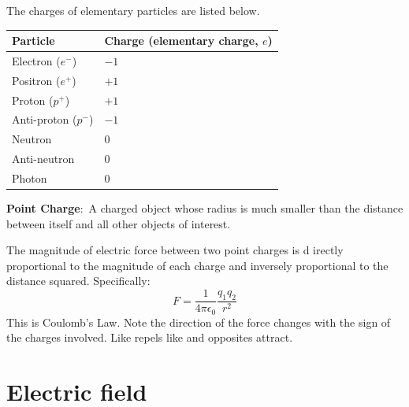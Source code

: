 \documentclass[nobib]{tufte-handout}
\newcommand{\defn}[2]{\noindent\textbf{#1}:\ #2}
\begin{document}
The charges of elementary particles are listed below.
\begin{table}[ht]
    \centering
    \begin{tabular}{@{}ll@{}}
    \toprule
    Particle & Charge (elementary charge, $e$) \\
    \midrule
    Electron ($e^-$) & $-1$ \\
    Positron ($e^+$) & $+1$ \\
    Proton ($p^+$) & $+1$ \\
    Anti-proton ($p^-$) & $-1$ \\
    Neutron& $0$ \\
    Anti-neutron & $0$ \\
    Photon& $0$ \\
    \bottomrule
    \end{tabular}
    \end{table}

\defn{Point Charge}{A charged object whose
radius is much smaller than the distance
between itself and all other objects of
interest.}

The magnitude of electric force between two point charges is d
irectly proportional to the magnitude of each charge and 
inversely proportional to the distance squared. Specifically:
\[F = \frac{1}{4\pi \epsilon_0}\frac{q_1 q_2}{r^2}\]
This is Coulomb's Law. Note the direction of the force changes
with the sign of the charges involved. Like repels like and opposites
attract. 

\pagebreak 

\section{Electric field}
\end{document}
